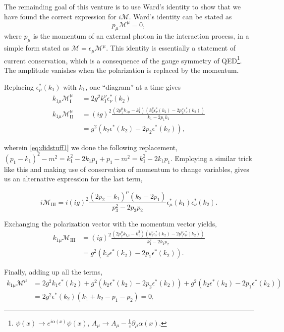\documentclass[11pt, a4paper]{amsart}
\begin{document}
The remainding goal of this venture is to use Ward's identity to show that we have found the correct expression for $i\mathcal{M}$. Ward's identity can be stated as 
\begin{equation}
p_\mu \mathcal{M}^\mu = 0,
\end{equation}
where $p_\mu$ is the momentum of an external photon in the interaction process, in a simple form stated as $\mathcal{M} = \epsilon_\mu \mathcal{M}^\mu$. This identity is essentially a statement of current conservation, which is a consequence of the gauge symmetry of QED\footnote{$\psi(x) \to e^{i\alpha(x)}\psi(x)$, $A_\mu \to A_\mu - \frac{1}{e}\partial_\mu \alpha(x)$.}. The amplitude vanishes when the polarization is replaced by the momentum.

Replacing $\epsilon_\mu^*(k_1)$ with $k_1$, one ``diagram'' at a time gives
\begin{align}
k_{1\mu}\mathcal{M}_{\text{I}}^\mu \ \ &= 2g^2k_1^\nu\epsilon_\nu^*(k_2) \\
k_{1\mu}\mathcal{M}_{\text{II}}^\mu \  &= (ig)^2\frac{(2p_1^\mu k_{1\mu} - k_1^2)(k_2^\nu\epsilon_\nu^*(k_2) - 2p_2^\nu\epsilon_\nu^*(k_2))}{k_1 - 2p_1k_1} \label{eq:didstuff1} \\
 &= g^2(k_2\epsilon^*(k_2) - 2p_2\epsilon^*(k_2)) \nonumber,
\end{align}

wherein \autoref{eq:didstuff1} we done the following replacement, $(p_1 - k_1)^2 - m^2 = k_1^2 - 2k_1p_1 + p_1 - m^2 = k_1^2 - 2k_1p_1$. Employing a similar trick like this and making use of conservation of momentum to change variables, gives us an alternative expression for the last term,

\begin{equation}
i \mathcal{M}_{\text{III}} = i(ig)^2 \frac{(2p_2 - k_1)^\mu(k_2 - 2p_1)}{p_3^2 - 2p_3p_2} \epsilon^*_\mu(k_1) \epsilon^*_\nu(k_2).
\end{equation}

Exchanging the polarization vector with the momentum vector yields,
\begin{align}
k_{1\mu}\mathcal{M}_{\text{III}} &= (ig)^2 \frac{(2p_2^\mu k_{1\mu} - k_1^2)(k_2^\nu\epsilon^*_\nu(k_2) - 2p_1^\nu\epsilon^*_\nu(k_2))}{k_1^2 - 2k_1p_2} \\
		&= g^2(k_2\epsilon^*(k_2) - 2p_1 \epsilon^*(k_2)). \nonumber
\end{align}

Finally, adding up all the terms,
\begin{align}
k_{1\mu}\mathcal{M}^\mu &= 2g^2k_1\epsilon^*(k_2) + g^2(k_2\epsilon^*(k_2) - 2p_2\epsilon^*(k_2)) + g^2(k_2\epsilon^*(k_2) - 2p_1\epsilon^*(k_2)) \\
		&= 2g^2\epsilon^*(k_2) ( k_1 + k_2 - p_1 - p_2) = 0,
\end{align}
\end{document}
